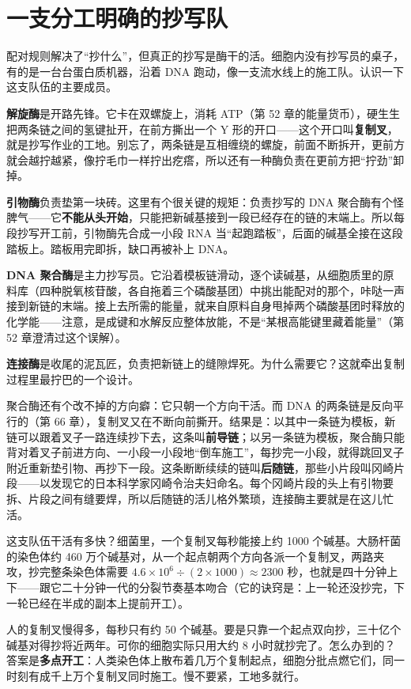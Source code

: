 \section{一支分工明确的抄写队}

配对规则解决了“抄什么”，但真正的抄写是酶干的活。细胞内没有抄写员的桌子，有的是一台台蛋白质机器，沿着 DNA 跑动，像一支流水线上的施工队。认识一下这支队伍的主要成员。

\textbf{解旋酶}是开路先锋。它卡在双螺旋上，消耗 ATP（第 52 章的能量货币），硬生生把两条链之间的氢键扯开，在前方撕出一个 Y 形的开口——这个开口叫\textbf{复制叉}，就是抄写作业的工地。别忘了，两条链是互相缠绕的螺旋，前面不断拆开，更前方就会越拧越紧，像拧毛巾一样拧出疙瘩，所以还有一种酶负责在更前方把“拧劲”卸掉。

\textbf{引物酶}负责垫第一块砖。这里有个很关键的规矩：负责抄写的 DNA 聚合酶有个怪脾气——它\textbf{不能从头开始}，只能把新碱基接到一段已经存在的链的末端上。所以每段抄写开工前，引物酶先合成一小段 RNA 当“起跑踏板”，后面的碱基全接在这段踏板上。踏板用完即拆，缺口再被补上 DNA。

\textbf{DNA 聚合酶}是主力抄写员。它沿着模板链滑动，逐个读碱基，从细胞质里的原料库（四种脱氧核苷酸，各自拖着三个磷酸基团）中挑出能配对的那个，咔哒一声接到新链的末端。接上去所需的能量，就来自原料自身甩掉两个磷酸基团时释放的化学能——注意，是成键和水解反应整体放能，不是“某根高能键里藏着能量”（第 52 章澄清过这个误解）。

\textbf{连接酶}是收尾的泥瓦匠，负责把新链上的缝隙焊死。为什么需要它？这就牵出复制过程里最拧巴的一个设计。

聚合酶还有个改不掉的方向癖：它只朝一个方向干活。而 DNA 的两条链是反向平行的（第 66 章），复制叉又在不断向前撕开。结果是：以其中一条链为模板，新链可以跟着叉子一路连续抄下去，这条叫\textbf{前导链}；以另一条链为模板，聚合酶只能背对着叉子前进方向、一小段一小段地“倒车施工”，每抄完一小段，就得跳回叉子附近重新垫引物、再抄下一段。这条断断续续的链叫\textbf{后随链}，那些小片段叫冈崎片段——以发现它的日本科学家冈崎令治夫妇命名。每个冈崎片段的头上有引物要拆、片段之间有缝要焊，所以后随链的活儿格外繁琐，连接酶主要就是在这儿忙活。

\begin{qiaoliang}
这支队伍干活有多快？细菌里，一个复制叉每秒能接上约 1000 个碱基。大肠杆菌的染色体约 460 万个碱基对，从一个起点朝两个方向各派一个复制叉，两路夹攻，抄完整条染色体需要 $4.6\times10^{6}\div(2\times1000)\approx2300$ 秒，也就是四十分钟上下——跟它二十分钟一代的分裂节奏基本吻合（它的诀窍是：上一轮还没抄完，下一轮已经在半成的副本上提前开工）。

人的复制叉慢得多，每秒只有约 50 个碱基。要是只靠一个起点双向抄，三十亿个碱基对得抄将近两年。可你的细胞实际只用大约 8 小时就抄完了。怎么办到的？答案是\textbf{多点开工}：人类染色体上散布着几万个复制起点，细胞分批点燃它们，同一时刻有成千上万个复制叉同时施工。慢不要紧，工地多就行。
\end{qiaoliang}

